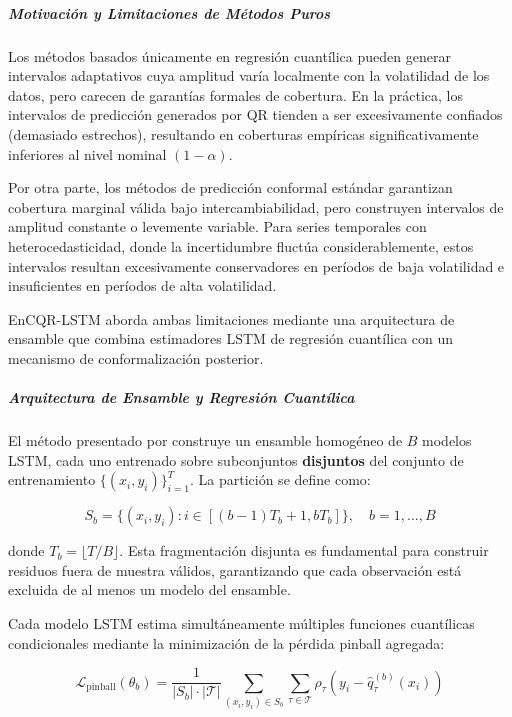\subparagraph{Motivación y Limitaciones de Métodos Puros}

Los métodos basados únicamente en regresión cuantílica pueden generar intervalos adaptativos cuya amplitud varía localmente con la volatilidad de los datos, pero carecen de garantías formales de cobertura. En la práctica, los intervalos de predicción generados por QR tienden a ser excesivamente confiados (demasiado estrechos), resultando en coberturas empíricas significativamente inferiores al nivel nominal $(1-\alpha)$. \parencite{Jensen2022}

Por otra parte, los métodos de predicción conformal estándar garantizan cobertura marginal válida bajo intercambiabilidad, pero construyen intervalos de amplitud constante o levemente variable. Para series temporales con heterocedasticidad, donde la incertidumbre fluctúa considerablemente, estos intervalos resultan excesivamente conservadores en períodos de baja volatilidad e insuficientes en períodos de alta volatilidad.

EnCQR-LSTM aborda ambas limitaciones mediante una arquitectura de ensamble que combina estimadores LSTM de regresión cuantílica con un mecanismo de conformalización posterior.

\subparagraph{Arquitectura de Ensamble y Regresión Cuantílica}

El método presentado por \cite{Jensen2022} construye un ensamble homogéneo de $B$ modelos LSTM, cada uno entrenado sobre subconjuntos \textbf{disjuntos} del conjunto de entrenamiento $\{(x_i, y_i)\}_{i=1}^{T}$. La partición se define como:

\begin{equation}
S_b = \{(x_i, y_i) : i \in [(b-1)T_b + 1, bT_b]\}, \quad b = 1, \ldots, B
\end{equation}

donde $T_b = \lfloor T/B \rfloor$. Esta fragmentación disjunta es fundamental para construir residuos fuera de muestra válidos, garantizando que cada observación está excluida de al menos un modelo del ensamble.

Cada modelo LSTM estima simultáneamente múltiples funciones cuantílicas condicionales mediante la minimización de la pérdida pinball agregada:

\begin{equation}
\mathcal{L}_{\text{pinball}}(\theta_b) = \frac{1}{|S_b| \cdot |\mathcal{T}|} \sum_{(x_i, y_i) \in S_b} \sum_{\tau \in \mathcal{T}} \rho_{\tau}(y_i - \hat{q}_{\tau}^{(b)}(x_i))
\end{equation}

